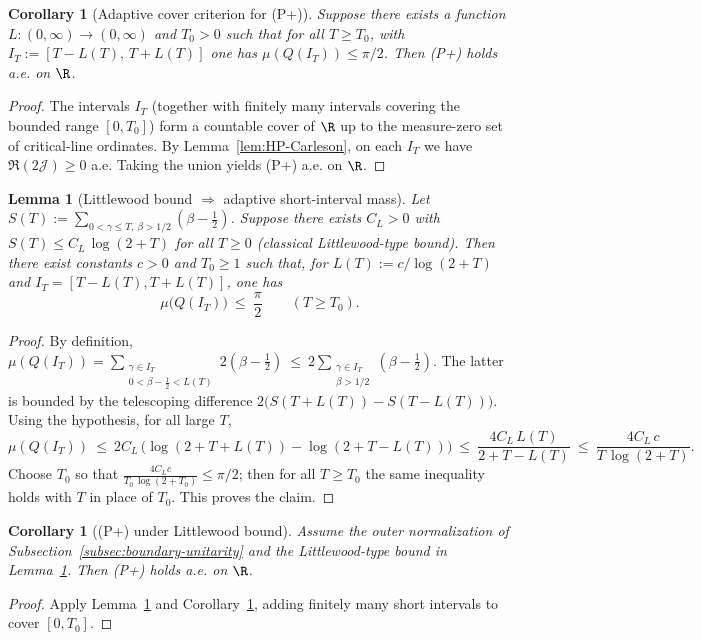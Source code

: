 \documentclass[11pt]{article}
\newtheorem{lemma}[theorem]{Lemma}
\newtheorem{corollary}[theorem]{Corollary}
\theoremstyle{remark}
\begin{document}
\begin{corollary}[Adaptive cover criterion for (P+)]\label{cor:adaptive-cover}
Suppose there exists a function \(L:(0,\infty)\to(0,\infty)\) and \(T_0>0\) such that for all \(T\ge T_0\), with \(I_T:=[T-L(T),\,T+L(T)]\) one has \(\mu(Q(I_T))\le \pi/2\). Then \emph{(P+)} holds a.e. on \(\R\).
\end{corollary}
\begin{proof}
The intervals \(I_T\) (together with finitely many intervals covering the bounded range \([0,T_0]\)) form a countable cover of \(\R\) up to the measure-zero set of critical-line ordinates. By Lemma~\ref{lem:HP-Carleson}, on each \(I_T\) we have \(\Re(2\mathcal J)\ge 0\) a.e. Taking the union yields (P+) a.e. on \(\R\).
\end{proof}

\begin{lemma}[Littlewood bound \(\Rightarrow\) adaptive short-interval mass]\label{lem:littlewood-adaptive}
Let \(S(T):=\sum_{0<\gamma\le T,\ \beta>1/2}(\beta-\tfrac12)\). Suppose there exists \(C_L>0\) with \(S(T)\le C_L\,\log(2+T)\) for all \(T\ge 0\) (classical Littlewood-type bound). Then there exist constants \(c>0\) and \(T_0\ge 1\) such that, for \(L(T):=c/\log(2+T)\) and \(I_T=[T-L(T),T+L(T)]\), one has
\[\mu\big(Q(I_T)\big)\ \le\ \frac{\pi}{2}\qquad (T\ge T_0).\]
\end{lemma}
\begin{proof}
By definition, \(\mu(Q(I_T))=\sum_{\substack{\gamma\in I_T\\ 0<\beta-\tfrac12< L(T)}} 2(\beta-\tfrac12)\ \le\ 2\sum_{\substack{\gamma\in I_T\\ \beta>1/2}} (\beta-\tfrac12)\). The latter is bounded by the telescoping difference \(2\big(S(T+L(T)) - S(T-L(T))\big)\). Using the hypothesis, for all large \(T\),
\[
 \mu(Q(I_T))\ \le\ 2C_L\,\Big(\log(2+T+L(T)) - \log(2+T-L(T))\Big)
 \ \le\ \frac{4C_L\,L(T)}{2+T-L(T)}\ \le\ \frac{4C_L\,c}{T\,\log(2+T)}.
\]
Choose \(T_0\) so that \(\frac{4C_L c}{T_0\,\log(2+T_0)}\le \pi/2\); then for all \(T\ge T_0\) the same inequality holds with \(T\) in place of \(T_0\). This proves the claim.
\end{proof}

\begin{corollary}[(P+) under Littlewood bound]\label{cor:Pplus-Littlewood}
Assume the outer normalization of Subsection~\ref{subsec:boundary-unitarity} and the Littlewood-type bound in Lemma~\ref{lem:littlewood-adaptive}. Then \emph{(P+)} holds a.e. on \(\R\).
\end{corollary}
\begin{proof}
Apply Lemma~\ref{lem:littlewood-adaptive} and Corollary~\ref{cor:adaptive-cover}, adding finitely many short intervals to cover \([0,T_0]\).
\end{proof}
\end{document}
